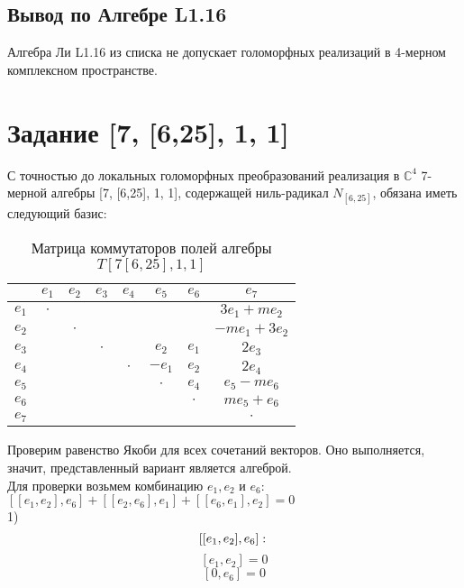 \documentclass[12pt]{article}
\begin{document}
\subsection{Вывод по Алгебре L1.16}
Алгебра Ли L1.16 из списка не допускает голоморфных реализаций в 4-мерном комплексном пространстве.
\newpage
\section{Задание [7, [6,25], 1, 1]}

С точностью до локальных голоморфных преобразований реализация в $\mathbb{C}^4$ 7-мерной алгебры [7, [6,25], 1, 1], содержащей ниль-радикал $N_{[6,25]}$, обязана иметь следующий базис:

\begin{table}[h!]
    \centering
    \renewcommand{\arraystretch}{1.5}
    \setlength{\arrayrulewidth}{0.3mm}
    \begin{tabular}{|c|c|c|c|c|c|c|c|}
        \hline
    & $e_1$ & $e_2$ & $e_3$ & $e_4$ & $e_5$ & $e_6$ & $e_7$ \\
        \hline
        $e_1$ & $\cdot$ & & & & & & $3e_1 + me_2$\\
        \hline
        $e_2$ & & $\cdot$ & & & & & $-me_1+3e_2$\\
        \hline
        $e_3$ & & & $\cdot$ & & $e_2$ & $e_1$ & $2e_3$\\
        \hline
        $e_4$ & & & & $\cdot$ & $-e_1$ & $e_2$ & $2e_4$ \\
        \hline
        $e_5$ & & & & & $\cdot$ & $e_4$ & $e_5-me_6$ \\
        \hline
        $e_6$ & & & & & & $\cdot$ & $me_5+e_6$ \\
        \hline
        $e_7$ & & & & & & & $\cdot$ \\
        \hline
    \end{tabular}
    \caption{Матрица коммутаторов полей алгебры $T [7[6,25],1,1]$}
\end{table}

Проверим равенство Якоби для всех сочетаний векторов. Оно выполняется, значит, представленный вариант является алгеброй. \\

Для проверки возьмем комбинацию \(e_1, e_2\) и \(e_6:\) \\

$[[e_1, e_2], e_6] + [[e_2, e_6], e_1] + [[e_6, e_1], e_2] = 0$ \\

1)
\[
 [[e_1, e_2], e_6]: \\
\]
\[
[e_1, e_2] = 0
\]
\[
[0, e_6] = 0 
\] \\
\end{document}
